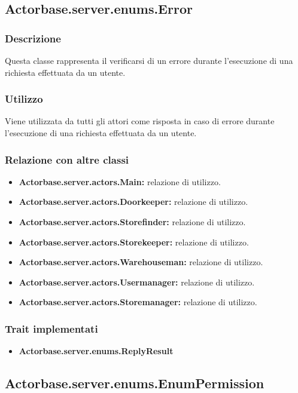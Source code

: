 \documentclass[a4paper]{article}
\begin{document}
		\subsection{Actorbase.server.enums.Error}
			\subsubsection{Descrizione}
				Questa classe rappresenta il verificarsi di un errore durante l'esecuzione di una richiesta effettuata da un utente.
				
			\subsubsection{Utilizzo}
				Viene utilizzata da tutti gli attori come risposta in caso di errore durante l'esecuzione di una richiesta effettuata da un utente.
				
			\subsubsection{Relazione con altre classi}
				\begin{itemize}
					\item \textbf{Actorbase.server.actors.Main:} relazione di utilizzo.
					\item \textbf{Actorbase.server.actors.Doorkeeper:} relazione di utilizzo.
					\item \textbf{Actorbase.server.actors.Storefinder:} relazione di utilizzo.
					\item \textbf{Actorbase.server.actors.Storekeeper:} relazione di utilizzo.
					\item \textbf{Actorbase.server.actors.Warehouseman:} relazione di utilizzo.
					\item \textbf{Actorbase.server.actors.Usermanager:} relazione di utilizzo.
					\item \textbf{Actorbase.server.actors.Storemanager:} relazione di utilizzo.
				\end{itemize}
				
			\subsubsection{Trait implementati}
				\begin{itemize}
					\item \textbf{Actorbase.server.enums.ReplyResult} 
				\end{itemize}
		
		\subsection{Actorbase.server.enums.EnumPermission}
\end{document}
